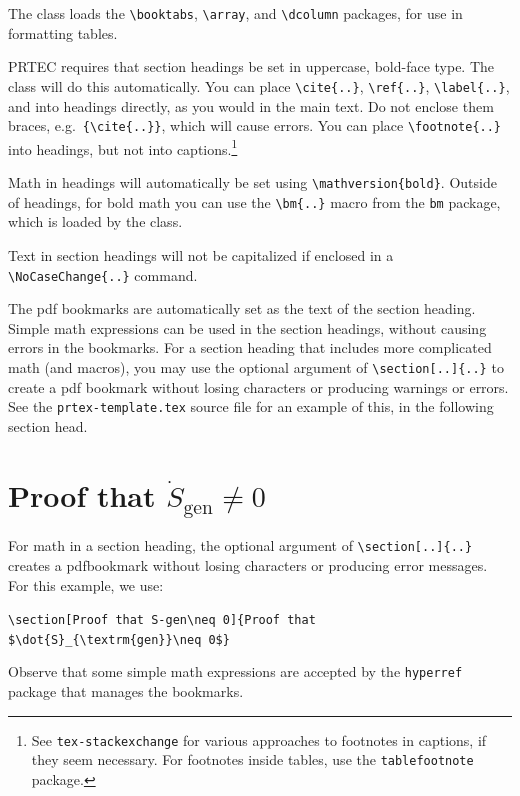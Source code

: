 \documentclass[upint,varvw]{prtec}
\begin{document}
The class loads the \verb|\booktabs|, \verb|\array|, and \verb|\dcolumn| packages, for use in formatting tables.

PRTEC requires that section headings be set in uppercase, bold-face type.  The class will do this automatically.  You can place \verb|\cite{..}|, \verb|\ref{..}|, \verb|\label{..}|, and into headings directly, as you would in the main text. Do not enclose them braces, e.g.\ \verb|{\cite{..}}|, which will cause errors. You can place \verb|\footnote{..}| into headings, but not into captions.\footnote{See \texttt{tex-stackexchange} for various approaches to footnotes in captions, if they seem necessary. For footnotes inside tables, use the \texttt{tablefootnote} package.}

Math in headings will automatically be set using \verb|\mathversion{bold}|. Outside of headings, for bold math you can use the \verb|\bm{..}| macro from the \texttt{bm} package, which is loaded by the class. 

Text in section headings will not be capitalized if enclosed in a \verb|\NoCaseChange{..}| command.

The pdf bookmarks are automatically set as the text of the section heading. Simple math expressions can be used in the section headings, without causing errors in the bookmarks.  For a section heading that includes more complicated math (and macros), you may use the optional argument of \verb|\section[..]{..}| to create a pdf bookmark without losing characters or producing warnings or errors. See the \texttt{prtex-template.tex} source file for an example of this, in the following section head.

\section[Proof that S-gen\neq 0]{Proof that $\dot{S}_{\textrm{gen}}\neq 0$}

For math in a section heading, the optional argument of \verb|\section[..]{..}| creates a pdfbookmark without losing characters or producing error messages. For this example, we use:

\verb|\section[Proof that S-gen\neq 0]{Proof that $\dot{S}_{\textrm{gen}}\neq 0$}|

Observe that some simple math expressions are accepted by the \verb|hyperref| package that manages the bookmarks.
\end{document}
